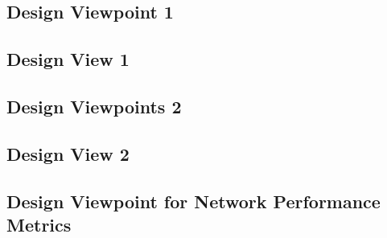 \documentclass[10pt,onecolumn,journal,draftclsnofoot]{IEEEtran}
\begin{document}
\subsection{Design Viewpoint 1}
\subsection{Design View 1}
\subsection{Design Viewpoints 2}
\subsection{Design View 2}
\subsection{Design Viewpoint for Network Performance Metrics}
\end{document}
